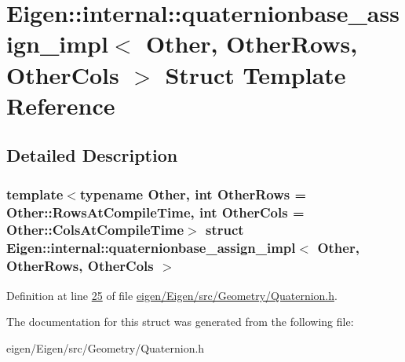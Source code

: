 \hypertarget{struct_eigen_1_1internal_1_1quaternionbase__assign__impl}{}\section{Eigen\+:\+:internal\+:\+:quaternionbase\+\_\+assign\+\_\+impl$<$ Other, Other\+Rows, Other\+Cols $>$ Struct Template Reference}
\label{struct_eigen_1_1internal_1_1quaternionbase__assign__impl}


\subsection{Detailed Description}
\subsubsection*{template$<$typename Other, int Other\+Rows = Other\+::\+Rows\+At\+Compile\+Time, int Other\+Cols = Other\+::\+Cols\+At\+Compile\+Time$>$\newline
struct Eigen\+::internal\+::quaternionbase\+\_\+assign\+\_\+impl$<$ Other, Other\+Rows, Other\+Cols $>$}



Definition at line \hyperlink{eigen_2_eigen_2src_2_geometry_2_quaternion_8h_source_l00025}{25} of file \hyperlink{eigen_2_eigen_2src_2_geometry_2_quaternion_8h_source}{eigen/\+Eigen/src/\+Geometry/\+Quaternion.\+h}.



The documentation for this struct was generated from the following file\+:\begin{DoxyCompactItemize}
\item 
eigen/\+Eigen/src/\+Geometry/\+Quaternion.\+h\end{DoxyCompactItemize}
